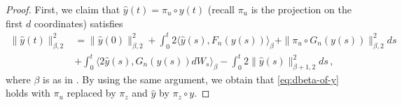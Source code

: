 \documentclass[final]{amsart}
\numberwithin{thm}{section}
\numberwithin{equation}{section}
\newcommand{\ip}[2]{\langle #1, #2 \rangle}
\begin{document}
\begin{proof}
    First, we claim that $\hat y(t) = \pi_u \circ y(t)$ (recall $\pi_u$ is the projection on the first $d$ coordinates) satisfies 
    \begin{equation}\label{eq:dbeta-of-y}
        \begin{aligned}
         \|\hat y(t)\|_{\beta,2}^2 &= \|\hat y(0)\|_{\beta,2}^2 + \int_0^t 2\ip{\hat y(s)}{F_n(y(s))}_\beta + \|\pi_u \circ G_n(y(s))\|_{\beta,2}^2 ds \\
         &+ \int_0^t \ip{2\hat y(s)}{G_n(y(s))dW_s}_\beta - \int_0^t 2\|\hat y(s)\|_{\beta+1,2}^2ds \,,
    \end{aligned}
    \end{equation}
    where $\beta$ is as in . By using the same argument, we obtain that \eqref{eq:dbeta-of-y} holds with 
     $\pi_u$ replaced by $\pi_z$ and $\hat y$ by $\pi_z \circ y$.


\end{proof}
\end{document}
